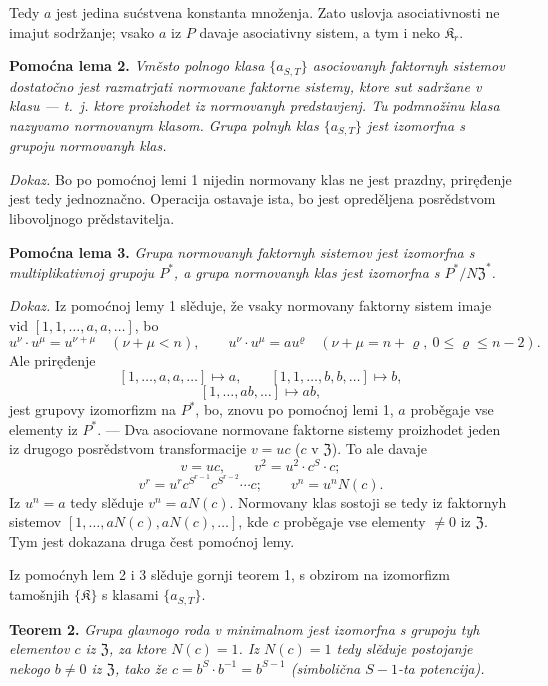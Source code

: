 \documentclass[11pt]{article}
\begin{document}
Tedy \(a\) jest jedina sućstvena konstanta množenja. Zato uslovja asociativnosti ne imajut sodržanje; vsako \(a\) iz \(P\) davaje asociativny sistem, a tym i neko \(\mathfrak K_r\).

\noindent\textbf{Pomoćna lema 2.} \emph{Vměsto polnogo klasa \(\{a_{S,T}\}\) asociovanyh faktornyh sistemov dostatočno jest razmatrjati normovane faktorne sistemy, ktore sut sadržane v klasu --- t.~j. ktore proizhodet iz normovanyh predstavjenj. Tu podmnožinu klasa nazyvamo normovanym klasom. Grupa polnyh klas \(\{a_{S,T}\}\) jest izomorfna s grupoju normovanyh klas.}

\noindent\emph{Dokaz.} Bo po pomoćnoj lemi 1 nijedin normovany klas ne jest prazdny, priręđenje jest tedy jednoznačno. Operacija ostavaje ista, bo jest opreděljena posrědstvom libovoljnogo prědstavitelja.

\noindent\textbf{Pomoćna lema 3.} \emph{Grupa normovanyh faktornyh sistemov jest izomorfna s multiplikativnoj grupoju \(P^*\), a grupa normovanyh klas jest izomorfna s \(P^*/N\mathfrak Z^*\).}

\noindent\emph{Dokaz.} Iz pomoćnoj lemy 1 slěduje, že vsaky normovany faktorny sistem imaje vid \([1,1,\ldots,a,a,\ldots]\), bo
\[
u^\nu\cdot u^\mu=u^{\nu+\mu}\quad(\nu+\mu<n),
\qquad
u^\nu\cdot u^\mu=au^\varrho\quad(\nu+\mu=n+\varrho,\ 0\leq\varrho\leq n-2).
\]
Ale priręđenje
\[
[1,\ldots,a,a,\ldots]\mapsto a,
\qquad
[1,1,\ldots,b,b,\ldots]\mapsto b,
\]
\[
[1,\ldots,ab,\ldots]\mapsto ab,
\]
jest grupovy izomorfizm na \(P^*\), bo, znovu po pomoćnoj lemi 1, \(a\) proběgaje vse elementy iz \(P^*\). --- Dva asociovane normovane faktorne sistemy proizhodet jeden iz drugogo posrědstvom transformacije \(v=uc\) (\(c\) v \(\mathfrak Z\)). To ale davaje
\[
v=uc,\qquad v^2=u^2\cdot c^S\cdot c;
\]
\[
v^r=u^r c^{S^{r-1}}c^{S^{r-2}}\cdots c;
\qquad
v^n=u^nN(c).
\]
Iz \(u^n=a\) tedy slěduje \(v^n=aN(c)\). Normovany klas sostoji se tedy iz faktornyh sistemov \([1,\ldots,aN(c),aN(c),\ldots]\), kde \(c\) proběgaje vse elementy \(\neq0\) iz \(\mathfrak Z\). Tym jest dokazana druga čest pomoćnoj lemy.

Iz pomoćnyh lem 2 i 3 slěduje gornji teorem 1, s obzirom na izomorfizm tamošnjih \(\{\mathfrak K\}\) s klasami \(\{a_{S,T}\}\).

\noindent\textbf{Teorem 2.} \emph{Grupa glavnogo roda v minimalnom jest izomorfna s grupoju tyh elementov \(c\) iz \(\mathfrak Z\), za ktore \(N(c)=1\). Iz \(N(c)=1\) tedy slěduje postojanje nekogo \(b\neq0\) iz \(\mathfrak Z\), tako že \(c=b^S\cdot b^{-1}=b^{S-1}\) (simbolična \(S-1\)-ta potencija).}
\end{document}
